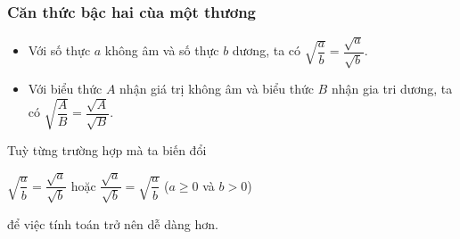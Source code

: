 \begin{tomtat}
\subsubsection{Căn thức bậc hai cùa một thương}
\begin{boxdn}
	\begin{itemize}
	\item
	Với số thực $a$ không âm và số thực $b$ dương, ta có
	$
	\sqrt{\dfrac{a}{b}}=\dfrac{\sqrt{a}}{\sqrt{b}}.
	$
	\item
	Với biểu thức $A$ nhận giá trị không âm và biểu thức $B$ nhận gia tri dương, ta có
	$
	\sqrt{\dfrac{A}{B}}=\dfrac{\sqrt{A}}{\sqrt{B}}.
	$
	\end{itemize}
\end{boxdn}
\begin{nx} %
	Tuỳ từng trường hợp mà ta biến đổi \begin{center}
	$\sqrt{\dfrac{a}{b}}=\dfrac{\sqrt{a}}{\sqrt{b}}$ hoặc $\dfrac{\sqrt{a}}{\sqrt{b}}=\sqrt{\dfrac{a}{b}}$ ($a \geq 0$ và $b>0$)
	\end{center} để việc tính toán trở nên dễ dàng hơn.
\end{nx}
\end{tomtat}
